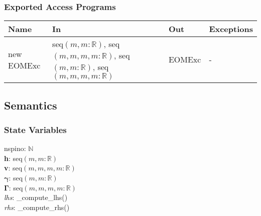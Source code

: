 \documentclass[12pt, titlepage]{article}
\begin{document}
\subsubsection{Exported Access Programs}

\begin{center}
	\begin{tabular}{p{2.3cm} p{4cm} p{4cm} p{2cm}}
		\hline
		\textbf{Name} & \textbf{In} & \textbf{Out} & \textbf{Exceptions} \\
		\hline
		new EOMExc & seq$(m,m:\mathbb{R})$, seq$(m,m,m,m:\mathbb{R})$, 
		seq$(m,m:\mathbb{R})$, seq$(m,m,m,m:\mathbb{R})$& EOMExc & - \\
		\hline
	\end{tabular}
\end{center}

\subsection{Semantics}

\subsubsection{State Variables}
nspino: $\mathbb{N}$\\
\textbf{h}: seq$(m,m:\mathbb{R})$\\
\textbf{v}: seq$(m,m,m,m:\mathbb{R})$\\
$\boldsymbol{\gamma}$: seq$(m,m:\mathbb{R})$\\
$\boldsymbol{\Gamma}$: seq$(m,m,m,m:\mathbb{R})$\\
\textit{lhs}: \_compute\_lhs()\\
\textit{rhs}: \_compute\_rhs()
\end{document}
